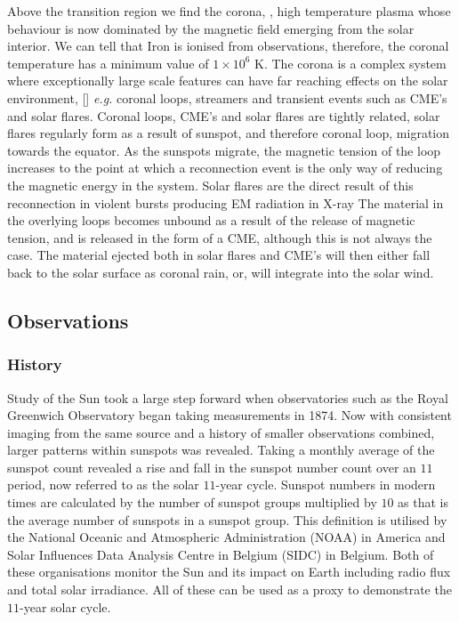 Above the transition region we find the corona, \cite{Golub2009}, high temperature plasma whose behaviour is now dominated by the magnetic field emerging from the solar interior.
We can tell that Iron is ionised from observations, therefore, the coronal temperature has a minimum value of $1 \times 10^6$ K.
The corona is a complex system where exceptionally large scale features can have far reaching effects on the solar environment, [\cite{Reale2014}] \emph{e.g.} coronal loops, streamers and transient events such as CME's and solar flares.
Coronal loops, CME's and solar flares are tightly related, solar flares regularly form as a result of sunspot, and therefore coronal loop, migration towards the equator.
As the sunspots migrate, the magnetic tension of the loop increases to the point at which a reconnection event is the only way of reducing the magnetic energy in the system.
Solar flares are the direct result of this reconnection in violent bursts producing EM radiation in X-ray
The material in the overlying loops becomes unbound as a result of the release of magnetic tension, and is released in the form of a CME, although this is not always the case.
The material ejected both in solar flares and CME's will then either fall back to the solar surface as coronal rain, or, will integrate into the solar wind.


\subsection{Observations}

\subsubsection{History}

Study of the Sun took a large step forward when observatories such as the Royal Greenwich Observatory began taking measurements in 1874.
Now with consistent imaging from the same source and a history of smaller observations combined, larger patterns within sunspots was revealed.
Taking a monthly average of the sunspot count revealed a rise and fall in the sunspot number count over an $11$ period, now referred to as the solar $11$-year cycle.
Sunspot numbers in modern times are calculated by the number of sunspot groups multiplied by $10$ as that is the average number of sunspots in a sunspot group.
This definition is utilised by the National Oceanic and Atmospheric Administration (NOAA) in America and Solar Influences Data Analysis Centre in Belgium (SIDC) in Belgium.
Both of these organisations monitor the Sun and its impact on Earth including radio flux and total solar irradiance.
All of these can be used as a proxy to demonstrate the $11$-year solar cycle.

